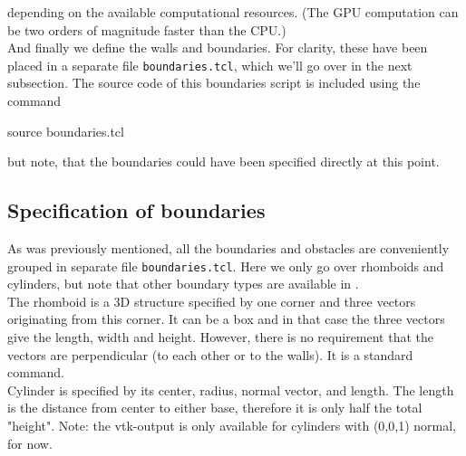 \documentclass[
a4paper,                        %
11pt,                           %
twoside,                        %
footsepline,                    %
headsepline,                    %
headexclude,                    %
footexclude,                    %
pagesize,                       %
]{scrartcl}
\begin{document}
depending on the available computational resources. (The GPU computation can be two orders of magnitude faster than the CPU.)\\

And finally we define the walls and boundaries. For clarity, these have been placed in a separate file \verb|boundaries.tcl|, which we'll go over in the next subsection. The source code of this boundaries script is included using the command\\
\begin{tclcode}
  source boundaries.tcl
\end{tclcode}
\vspace{0 mm}

but note, that the boundaries could have been specified directly at this point.\\  

\subsection*{Specification of boundaries}
As was previously mentioned, all the boundaries and obstacles are conveniently grouped in separate file \verb|boundaries.tcl|. Here we only go over rhomboids and cylinders, but note that other boundary types are available in \es.\\

The rhomboid is a 3D structure specified by one corner and three vectors originating from this corner. It can be a box and in that case the three vectors give the length, width and height. However, there is no requirement that the vectors are perpendicular (to each other or to the walls). It is a standard \es command.\\

Cylinder is specified by its center, radius, normal vector, and length. The length is the distance from center to either base, therefore it is only half the total "height". Note: the vtk-output is only available for cylinders with (0,0,1) normal, for now. \\ 
\end{document}
